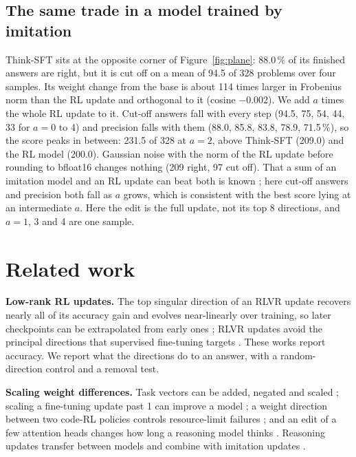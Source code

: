 \documentclass[10pt]{article}
\begin{document}
\subsection{The same trade in a model trained by imitation}\label{sec:transplant}

Think-SFT sits at the opposite corner of Figure~\ref{fig:plane}: 88.0\,\% of its finished answers are right, but
it is cut off on a mean of 94.5 of 328 problems over four samples. Its weight change from the base is about 114
times larger in Frobenius norm than the RL update and orthogonal to it (cosine $-0.002$). We add $a$ times the
whole RL update to it. Cut-off answers fall with every step (94.5, 75, 54, 44, 33 for $a = 0$ to 4) and precision falls with them (88.0, 85.8, 83.8, 78.9,
71.5\,\%), so the score peaks in between: 231.5 of 328 at $a = 2$, above Think-SFT (209.0) and the RL model
(200.0). Gaussian noise with the norm of the RL update before rounding to bfloat16 changes nothing (209 right, 97
cut off). That a sum of an imitation model and an RL update can beat both is known \cite{yuan2026decouple}; here
cut-off answers and precision both fall as $a$ grows, which is consistent with the best score lying at an
intermediate $a$. Here the edit is the full update, not its top 8 directions, and
$a = 1$, 3 and 4 are one sample.

\section{Related work}

\textbf{Low-rank RL updates.} The top singular direction of an RLVR update recovers nearly all of its accuracy gain
\cite{cai2025predictability,wei2026minimal,ye2026implicit} and evolves near-linearly over training, so later
checkpoints can be extrapolated from early ones \cite{cai2025predictability,wei2026minimal}; RLVR updates avoid
the principal directions that supervised fine-tuning targets \cite{zhu2025path}. These works report accuracy. We
report what the directions do to an answer, with a random-direction control and a removal test.

\textbf{Scaling weight differences.} Task vectors can be added, negated and scaled \cite{ilharco2022editing};
scaling a fine-tuning update past 1 can improve a model \cite{zheng2024model}; a weight direction between two
code-RL policies controls resource-limit failures \cite{zheng2026correctness}; and an edit of a few attention heads
changes how long a reasoning model thinks \cite{sun2025thinkedit}. Reasoning updates transfer between models
\cite{zbeeb2025reasoning} and combine with imitation updates \cite{yuan2026decouple}.
\end{document}
